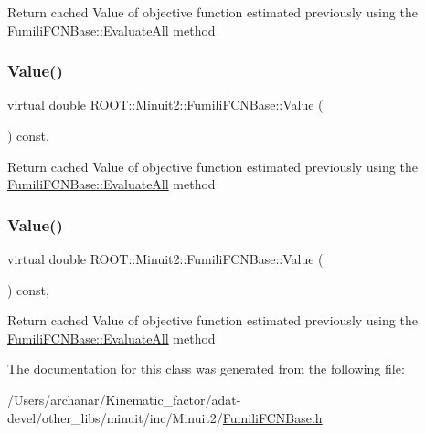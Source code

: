 Return cached Value of objective function estimated previously using the \mbox{\hyperlink{classROOT_1_1Minuit2_1_1FumiliFCNBase_a0741bb4a7405cc33ab60583472a189cb}{Fumili\+F\+C\+N\+Base\+::\+Evaluate\+All}} method \mbox{\label{classROOT_1_1Minuit2_1_1FumiliFCNBase_a221dacee0ccde747a271a0cecd759f98}} 
\subsubsection{\texorpdfstring{Value()}{Value()}\hspace{0.1cm}{\footnotesize\ttfamily [2/3]}}
{\footnotesize\ttfamily virtual double R\+O\+O\+T\+::\+Minuit2\+::\+Fumili\+F\+C\+N\+Base\+::\+Value (\begin{DoxyParamCaption}{ }\end{DoxyParamCaption}) const\hspace{0.3cm}{\ttfamily [inline]}, {\ttfamily [virtual]}}

Return cached Value of objective function estimated previously using the \mbox{\hyperlink{classROOT_1_1Minuit2_1_1FumiliFCNBase_a0741bb4a7405cc33ab60583472a189cb}{Fumili\+F\+C\+N\+Base\+::\+Evaluate\+All}} method \mbox{\label{classROOT_1_1Minuit2_1_1FumiliFCNBase_a221dacee0ccde747a271a0cecd759f98}} 
\subsubsection{\texorpdfstring{Value()}{Value()}\hspace{0.1cm}{\footnotesize\ttfamily [3/3]}}
{\footnotesize\ttfamily virtual double R\+O\+O\+T\+::\+Minuit2\+::\+Fumili\+F\+C\+N\+Base\+::\+Value (\begin{DoxyParamCaption}{ }\end{DoxyParamCaption}) const\hspace{0.3cm}{\ttfamily [inline]}, {\ttfamily [virtual]}}

Return cached Value of objective function estimated previously using the \mbox{\hyperlink{classROOT_1_1Minuit2_1_1FumiliFCNBase_a0741bb4a7405cc33ab60583472a189cb}{Fumili\+F\+C\+N\+Base\+::\+Evaluate\+All}} method 

The documentation for this class was generated from the following file\+:\begin{DoxyCompactItemize}
\item 
/\+Users/archanar/\+Kinematic\+\_\+factor/adat-\/devel/other\+\_\+libs/minuit/inc/\+Minuit2/\mbox{\hyperlink{adat-devel_2other__libs_2minuit_2inc_2Minuit2_2FumiliFCNBase_8h}{Fumili\+F\+C\+N\+Base.\+h}}\end{DoxyCompactItemize}
